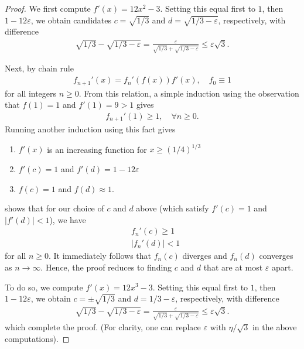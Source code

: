 \documentclass[12pt,reqno]{amsart}
\numberwithin{equation}{section}  %
\newcommand{\ee}{\varepsilon}
\begin{document}
\begin{proof}
We first compute $f'(x) = 12x^2 - 3$. Setting this equal first
to $1$, then $1- 12\ee$, we obtain candidates $c = \sqrt{1/3}$ and $d =
\sqrt{1/3 - \ee}$, respectively, with difference
\begin{align*}
\sqrt{1/3} - \sqrt{1/3 - \ee} = \frac{\ee}{\sqrt{1/3} + \sqrt{1/3 - \ee}} \le
\ee \sqrt{3}.
\end{align*}

Next, by chain rule
\begin{align*}
f_{n+1}'(x) = f_n'(f(x)) f'(x), \quad f_0 \equiv 1
\end{align*}
for all integers $n \ge 0$.
From this relation, a simple induction
using the observation that $f(1) = 1$ and $f'(1) = 9 > 1$
gives
\begin{align*}
f_{n+1}'(1) \ge 1, \quad \forall n\ge0.
\end{align*}
Running another induction using this fact gives
\begin{enumerate}
\item
$f'(x)$ is an increasing function for $x \ge (1/4)^{1/3}$
\item
$f'(c)=1$ and $f'(d) = 1 - 12 \ee$
\item
$f(c) = 1$ and $f(d) \approx 1$.
\end{enumerate}
shows that for our choice of $c$ and $d$ above
(which satisfy $f'(c) = 1$ and $|f'(d)| < 1$), we have
\begin{align*}
& f_{n}'(c) \ge 1 \\
& | f_{n}'(d) |  < 1
\end{align*}
for all $n \ge 0$.
It immediately follows that $f_n(c)$ diverges and $f_n(d)$ converges
as $n \to \infty$. Hence, the proof reduces to finding $c$ and $d$
that are at most $\ee$ apart.


To do so, we compute $f'(x) = 12x^3 - 3$. Setting this equal first
to $1$, then $1- 12\ee$, we obtain $c = \pm \sqrt{1/3}$ and $d = 1/3 - \ee$,
respectively, with difference
\begin{align*}
\sqrt{1/3} - \sqrt{1/3 - \ee} = \frac{\ee}{\sqrt{1/3} + \sqrt{1/3 - \ee}} \le
\ee \sqrt{3}.
\end{align*}
which complete the proof. (For clarity, one can replace $\ee$ with
$\eta/\sqrt{3}$ in the above computations).

\end{proof}


        
\end{document}
